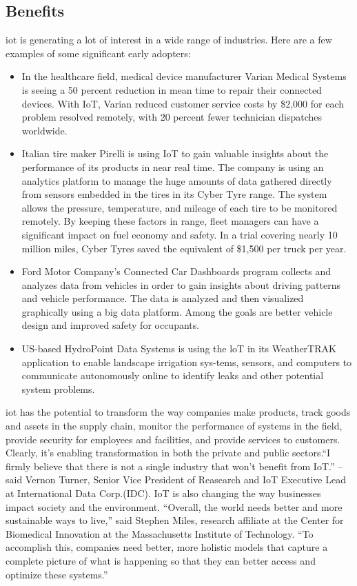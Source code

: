 \subsection{Benefits}
\gls{iot} is generating a lot of interest in a wide range of industries. Here are a few examples of some significant
early adopters:\\
\begin{itemize}
	\item In the healthcare field, medical device manufacturer Varian Medical Systems is seeing a 50 percent reduction
in mean time to repair their connected devices.\cite{varian_reduce} With IoT, Varian reduced customer service costs by
\$2,000 for each problem resolved remotely, with 20 percent fewer technician dispatches worldwide.
	\item Italian tire maker Pirelli is using IoT to gain valuable insights about the performance of its products in near real
time.\cite{6861917} The company is using an analytics platform to manage the huge amounts of data gathered
directly from sensors embedded in the tires in its Cyber Tyre range. The system allows the pressure,
temperature, and mileage of each tire to be monitored remotely. By keeping these factors in range, fleet
managers can have a significant impact on fuel economy and safety. In a trial covering nearly 10 million
miles, Cyber Tyres saved the equivalent of \$1,500 per truck per year\cite{5659348}.
\item Ford Motor Company’s Connected Car Dashboards program collects and analyzes data from vehicles
in order to gain insights about driving patterns and vehicle performance. The data is analyzed and
then visualized graphically using a big data platform. Among the goals are better vehicle design and
improved safety for occupants.\cite{6861917}
\item US-based HydroPoint Data Systems is using the loT in its WeatherTRAK application to enable landscape irrigation sys-tems, sensors, and computers to communicate autonomously online to identify leaks and other potential system problems. \cite{6861917}
\end{itemize}

\gls{iot} has the potential to transform the way companies make products, track goods and assets in the supply
chain, monitor the performance of systems in the field, provide security for employees and facilities,
and provide services to customers. Clearly, it’s enabling transformation in both the private and public
sectors.\newline \enquote{I firmly believe that there is not a single industry that won’t benefit from IoT.} -- said Vernon Turner, Senior Vice President of Reasearch and IoT Executive Lead at International Data Corp.(IDC). IoT is also changing the way businesses impact society and the environment. “Overall, the world needs better and more sustainable ways to live,” said Stephen Miles, research affiliate at the Center for Biomedical Innovation at the Massachusetts Institute of Technology. “To accomplish this, companies need better, more holistic models that capture a complete picture of what is happening so that they can better access
and optimize these systems.”

